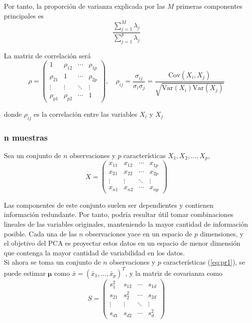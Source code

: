 \noindent Por tanto, la proporción de varianza explicada por las $M$ primeras componentes principales es
\begin{equation}
\frac{\sum_{j=1}^M \lambda_j}{\sum_{j=1}^p \lambda_j}
\end{equation}

\noindent La matriz de correlación será 
\begin{equation}
\rho = \begin{pmatrix}  
1 & \rho_{12} & \cdots & \rho_{1p} \\
\rho_{21} & 1 & \cdots & \rho_{2p} \\
\vdots & \vdots & \ddots & \vdots \\
\rho_{p1} & \rho_{p2} & \cdots & 1
\end{pmatrix}, \quad \rho_{ij} = \frac{\sigma_{ij}}{\sigma_i \sigma_j} = \frac{\text{Cov}(X_i, X_j)}{\sqrt{\text{Var}(X_i) \text{Var}(X_j)}}
\end{equation}

\noindent donde $\rho_{ij}$ es la correlación entre las variables $X_i$ y $X_j$


\subsubsection{n muestras}

Sea un conjunto de $n$ observaciones y $p$ características $X_1, X_2, \ldots, X_p$, 
\begin{equation}
X = \begin{pmatrix}
x_{11} & x_{12} & \cdots & x_{1p} \\
x_{21} & x_{22} & \cdots & x_{2p} \\
\vdots & \vdots & \ddots & \vdots \\
x_{n1} & x_{n2} & \cdots & x_{np}
\end{pmatrix}
\label{eq:pr1}
\end{equation}

Las componentes de este conjunto suelen ser dependientes y contienen información redundante. Por tanto, podría resultar útil tomar combinaciones lineales de las variables originales, manteniendo la mayor cantidad de información posible. Cada una de las $n$ observaciones yace en un espacio de $p$ dimensiones, y el objetivo del PCA es proyectar estos datos en un espacio de menor dimensión que contenga la mayor cantidad de variabilidad en los datos. \\

Si ahora se toma un conjunto de $n$ observaciones y $p$ características (\ref{eq:pr1}), se puede estimar $\boldsymbol{\mu}$ como $\bar{x} = (\bar{x}_1, \dots, \bar{x}_p)^T$, y la matriz de covarianza como 
\begin{equation}
S = \begin{pmatrix}
s_1^2 & s_{12} & \cdots & s_{1d} \\
s_{21} & s_2^2 & \cdots & s_{2d} \\
\vdots & \vdots & \ddots & \vdots \\
s_{d1} & s_{d2} & \cdots & s_d^2
\end{pmatrix}
\end{equation}

